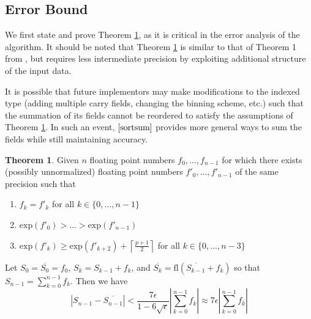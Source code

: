 \documentclass[12pt]{article}
\providecommand{\ceil}[1]{\left \lceil #1 \right \rceil }
\providecommand{\exp}{\ensuremath{\text{exp}}}
\providecommand{\fl}{\ensuremath{\text{fl}}}
\theoremstyle{definition}
\newtheorem{thm}{Theorem}[section]
\numberwithin{equation}{section}
\numberwithin{figure}{section}
\begin{document}
  \subsection{Error Bound}
    \label{sec:primitiveops_error}

    We first state and prove Theorem \ref{thm:mysortsum}, as it is critical in the error analysis of the algorithm. It should be noted that Theorem \ref{thm:mysortsum} is similar to that of Theorem 1 from \cite{sortsum}, but requires less intermediate precision by exploiting additional structure of the input data.

    It is possible that future implementors may make modifications to the indexed type (adding multiple carry fields, changing the binning scheme, etc.) such that the summation of its fields cannot be reordered to satisfy the assumptions of Theorem \ref{thm:mysortsum}. In such an event, $\cite{sortsum}$ provides more general ways to sum the fields while still maintaining accuracy.
      \begin{samepage}
    \begin{thm}
      Given $n$ floating point numbers $f_0, ..., f_{n - 1}$ for which there exists (possibly unnormalized) floating point numbers $f'_0, ..., f'_{n - 1}$ of the same precision such that
      \begin{enumerate}
        \item $f_k = f'_k$ for all $k \in \{0, ..., n - 1\}$
        \item $\exp(f'_0) > ... > \exp(f'_{n - 1})$
        \item $\exp(f'_k) \geq \exp(f'_{k + 2}) + \ceil{\frac{p + 1}{2}}$ for all $k \in \{0, ..., n - 3\}$
      \end{enumerate}
      \label{thm:mysortsum}
      Let $S_0 = \overline{S_0} = f_0$, $S_k = S_{k - 1} + f_k$, and $\overline{S_k} = \fl(\overline{S_{k - 1}} + f_k)$ so that $S_{n - 1} = \sum \limits_{k = 0}^{n - 1} f_k$.
      Then we have
      \begin{equation*}
        |S_{n - 1} - \overline{S_{n - 1}}| < \frac{7\epsilon}{1 - 6\sqrt\epsilon}|\sum\limits_{k = 0}^{n - 1}f_k| \approx 7 \epsilon |\sum\limits_{k = 0}^{n - 1}f_k|
      \end{equation*}
    \end{thm}
    \end{samepage}
\end{document}
